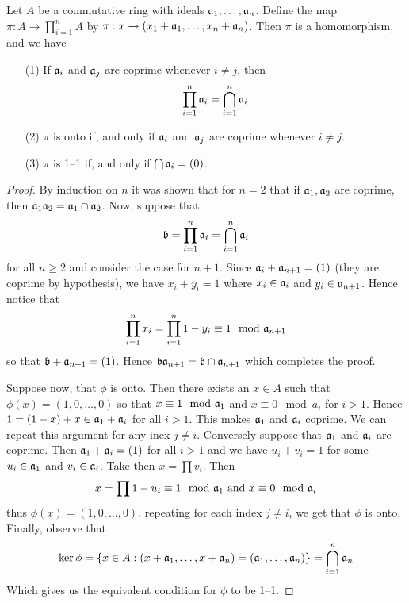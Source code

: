 \begin{theorem}\label{theorem_1.10.7}
  Let $A$ be a commutative ring with ideals $\mathfrak{a}_1, \dots, \mathfrak{a}_n$. Define the
  map $\pi:A \xrightarrow{} \prod_{i=1}^n{A}$ by $\pi:x \xrightarrow{}
  (x_1+\mathfrak{a}_1, \dots, x_n+\mathfrak{a}_n)$. Then $\pi$ is a homomorphism, and we have
  \begin{enumerate}
    \item[(1)] If $\mathfrak{a}_i$ and  $\mathfrak{a}_j$ are coprime whenever $i \neq j$, then
      \begin{equation*}
        \prod_{i=1}^n{\mathfrak{a}_i}=\bigcap_{i=1}^n{\mathfrak{a}_i}
      \end{equation*}

    \item[(2)] $\pi$ is onto if, and only if $\mathfrak{a}_i$ and $\mathfrak{a}_j$ are coprime
      whenever  $i \neq j$.

    \item[(3)] $\pi$ is 1--1 if, and only if  $\bigcap{\mathfrak{a}_i}=(0)$.
  \end{enumerate}
\end{theorem}
\begin{proof}
    By induction on $n$ it was shown that for $n=2$ that if $\mathfrak{a}_1,\mathfrak{a}_2$ are
    coprime, then $\mathfrak{a}_1\mathfrak{a}_2=\mathfrak{a}_1 \cap \mathfrak{a}_2$. Now, suppose that
    \begin{equation*}
        \mathfrak{b}=\prod_{i=1}^n{\mathfrak{a}_i}=\bigcap_{i=1}^n{\mathfrak{a}_i}
    \end{equation*}
    for all $n \geq 2$ and consider the case for $n+1$. Since
    $\mathfrak{a}_i+\mathfrak{a}_{n+1}=(1)$ (they are coprime by hypothesis), we have $x_i+y_i=1$
    where  $x_i \in \mathfrak{a}_i$ and  $y_i \in \mathfrak{a}_{n+1}$. Hence notice that
    \begin{equation*}
        \prod_{i=1}^n{x_i}=\prod_{i=1}^n{1-y_i} \equiv 1 \mod{\mathfrak{a}_{n+1}}
    \end{equation*}
    so that $\mathfrak{b}+\mathfrak{a}_{n+1}=(1)$. Hence $\mathfrak{b}\mathfrak{a}_{n+1}=\mathfrak{b} \cap \mathfrak{a}_{n+1}$ which
    completes the proof.

    Suppose now, that $\phi$ is onto. Then there exists an  $x \in A$ such that
     $\phi(x)=(1,0, \dots, 0)$ so that $x \equiv 1 \mod{\mathfrak{a}_1}$ and $x \equiv 0
     \mod{a_i}$ for $i>1$. Hence  $1=(1-x)+x \in \mathfrak{a}_1+\mathfrak{a}_i$ for all $i>1$.
     This makes  $\mathfrak{a}_1$ and $\mathfrak{a}_i$ coprime. We can repeat this argument for
     any inex  $j \neq i$. Conversely suppose that $\mathfrak{a}_1$ and $\mathfrak{a}_i$ are
     coprime. Then $\mathfrak{a}_1+\mathfrak{a}_i=(1)$ for all $i>1$ and we have  $u_i+v_i=1$ for
     some  $u_i \in \mathfrak{a}_1$ and $v_i \in \mathfrak{a}_i$. Take then  $x=\prod{v_i}$. Then
     \begin{equation*}
         x=\prod{1-u_i} \equiv 1 \mod{\mathfrak{a}_1} \text{ and } x \equiv 0 \mod{\mathfrak{a}_i}
     \end{equation*}
     thus $\phi(x)=(1,0, \dots, 0)$. repeating for each index $j \neq i$, we get
     that  $\phi$ is onto. Finally, observe that
     \begin{equation*}
        \ker{\phi}=\{x \in A : (x+\mathfrak{a}_1, \dots,x+\mathfrak{a}_n)=(\mathfrak{a}_1, \dots, \mathfrak{a}_n)\}=
      \bigcap_{i=1}^n{\mathfrak{a}_n}
     \end{equation*}
     Which gives us the equivalent condition for $\phi$ to be 1--1.
\end{proof}

